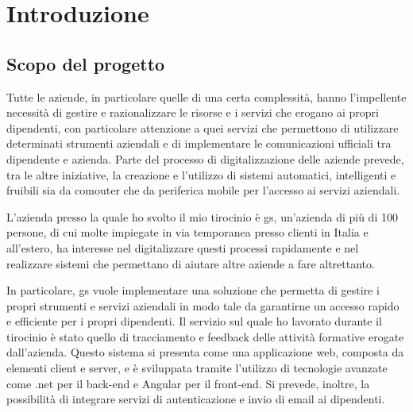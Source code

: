 \chapter{Introduzione}\label{ch:introduzione}
\section{Scopo del progetto}\label{sec:scopo-del-progetto}
Tutte le aziende, in particolare quelle di una certa complessità, hanno l'impellente necessità di gestire e razionalizzare le risorse e i servizi che erogano ai propri dipendenti, con particolare attenzione a quei servizi che permettono di utilizzare determinati strumenti aziendali e di implementare le comunicazioni ufficiali tra dipendente e azienda. 
Parte del processo di digitalizzazione delle aziende prevede, tra le altre iniziative, la creazione e l'utilizzo di sistemi automatici, intelligenti e fruibili sia da comouter che da periferica mobile per l'accesso ai servizi aziendali.\newline

L'azienda presso la quale ho svolto il mio tirocinio è \acrfull{gs}, un'azienda di più di 100 persone, di cui molte impiegate in via temporanea presso clienti in Italia e all'estero, ha interesse nel digitalizzare questi processi rapidamente e nel realizzare sistemi che permettano di aiutare altre aziende a fare altrettanto.\newline

In particolare, \acrlong{gs} vuole implementare una soluzione che permetta di gestire i propri strumenti e servizi aziendali in modo tale da garantirne un accesso rapido e efficiente per i propri dipendenti. Il servizio sul quale ho lavorato durante il tirocinio è stato quello di tracciamento e feedback delle attività formative erogate dall'azienda.
Questo sistema si presenta come una applicazione web, composta da elementi client e server, e è sviluppata tramite l'utilizzo di tecnologie avanzate come \gls{.net} per il back-end e Angular per il front-end. Si prevede, inoltre, la possibilità di integrare servizi di autenticazione e invio di email ai dipendenti.\newline


